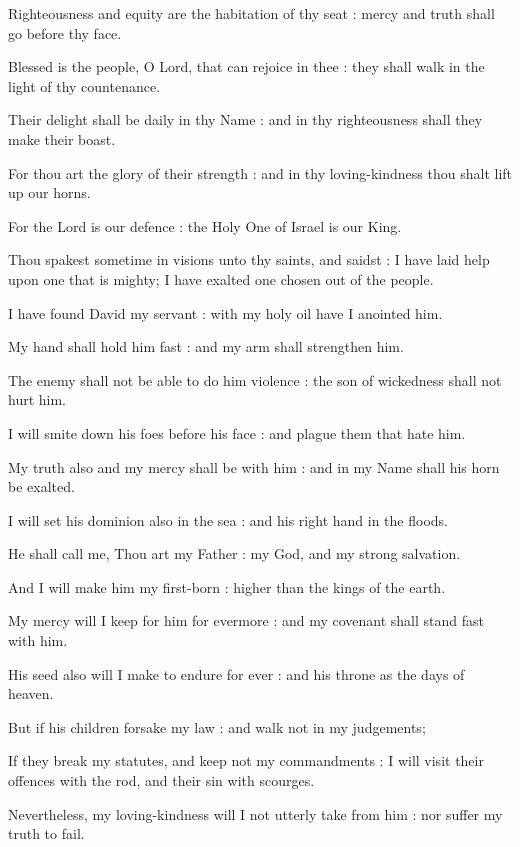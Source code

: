 Righteousness and equity are the habitation of thy seat : mercy and truth shall go before thy face.\par
{}Blessed is the people, O Lord, that can rejoice in thee : they shall walk in the light of thy countenance.\par
{}Their delight shall be daily in thy Name : and in thy righteousness shall they make their boast.\par
{}For thou art the glory of their strength : and in thy loving-kindness thou shalt lift up our horns.\par
{}For the Lord is our defence : the Holy One of Israel is our King.\par
{}Thou spakest sometime in visions unto thy saints, and saidst : I have laid help upon one that is mighty; I have exalted one chosen out of the people.\par
{}I have found David my servant : with my holy oil have I anointed him.\par
{}My hand shall hold him fast : and my arm shall strengthen him.\par
{}The enemy shall not be able to do him violence : the son of wickedness shall not hurt him.\par
{}I will smite down his foes before his face : and plague them that hate him.\par
{}My truth also and my mercy shall be with him : and in my Name shall his horn be exalted.\par
{}I will set his dominion also in the sea : and his right hand in the floods.\par
{}He shall call me, Thou art my Father : my God, and my strong salvation.\par
{}And I will make him my first-born : higher than the kings of the earth.\par
{}My mercy will I keep for him for evermore : and my covenant shall stand fast with him.\par
{}His seed also will I make to endure for ever : and his throne as the days of heaven.\par
{}But if his children forsake my law : and walk not in my judgements;\par
{}If they break my statutes, and keep not my commandments : I will visit their offences with the rod, and their sin with scourges.\par
{}Nevertheless, my loving-kindness will I not utterly take from him : nor suffer my truth to fail.\par
